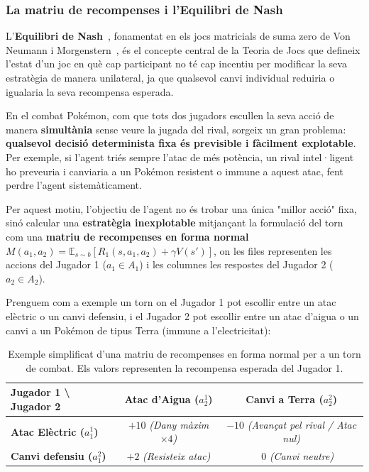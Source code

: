 \subsubsection{La matriu de recompenses i l'Equilibri de Nash}

L'\textbf{Equilibri de Nash}~\cite{nash_1950}, fonamentat en els jocs matricials de suma zero de Von Neumann i Morgenstern~\cite{von_neumann}, és el concepte central de la Teoria de Jocs que defineix l'estat d'un joc en què cap participant no té cap incentiu per modificar la seva estratègia de manera unilateral, ja que qualsevol canvi individual reduiria o igualaria la seva recompensa esperada.

En el combat Pokémon, com que tots dos jugadors escullen la seva acció de manera \textbf{simultània} sense veure la jugada del rival, sorgeix un gran problema: \textbf{qualsevol decisió determinista fixa és previsible i fàcilment explotable}. Per exemple, si l'agent triés sempre l'atac de més potència, un rival intel·ligent ho preveuria i canviaria a un Pokémon resistent o immune a aquest atac, fent perdre l'agent sistemàticament.

Per aquest motiu, l'objectiu de l'agent no és trobar una única "millor acció" fixa, sinó calcular una \textbf{estratègia inexplotable} mitjançant la formulació del torn com una \textbf{matriu de recompenses en forma normal} $M(a_1, a_2) = \mathbb{E}_{s \sim b} [R_1(s, a_1, a_2) + \gamma V(s')]$, on les files representen les accions del Jugador 1 ($a_1 \in A_1$) i les columnes les respostes del Jugador 2 ($a_2 \in A_2$).

Prenguem com a exemple un torn on el Jugador 1 pot escollir entre un atac elèctric o un canvi defensiu, i el Jugador 2 pot escollir entre un atac d'aigua o un canvi a un Pokémon de tipus Terra (immune a l'electricitat):
\begin{table}[htbp]
    \centering
    \small
    \renewcommand{\arraystretch}{1.4}
    \setlength{\tabcolsep}{6pt}
    \begin{tabular}{lcc}
        \toprule
        \textbf{Jugador 1 \textbackslash{} Jugador 2} & \textbf{Atac d'Aigua ($a_2^1$)} & \textbf{Canvi a Terra ($a_2^2$)} \\
        \midrule
        \textbf{Atac Elèctric ($a_1^1$)}  & $+10$ \quad \textit{(Dany màxim $\times 4$)}   & $-10$ \quad \textit{(Avançat pel rival / Atac nul)} \\
        \textbf{Canvi defensiu ($a_1^2$)} & $+2$ \quad \textit{(Resisteix atac)}           & $\phantom{+}0$ \quad \textit{(Canvi neutre)} \\
        \bottomrule
    \end{tabular}
    \caption{Exemple simplificat d'una matriu de recompenses en forma normal per a un torn de combat. Els valors representen la recompensa esperada del Jugador 1.}
    \label{tab:payoff_matrix_example}
\end{table}

